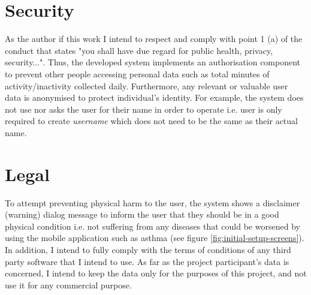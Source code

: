     \section{Security}
    As the author if this work I intend to respect and comply with point 1 (a) of the conduct that states "you shall have due regard for public health, privacy, security...". Thus, the developed system implements an authorisation component to prevent other people accessing personal data such as total minutes of activity/inactivity collected daily. Furthermore, any relevant or valuable user data is anonymised to protect individual’s identity. For example, the system does not use nor asks the user for their name in order to operate i.e. user is only required to create \textit{username} which does not need to be the same as their actual name.

    
    \section{Legal}
    To attempt preventing physical harm to the user, the system shows a disclaimer (warning) dialog message to inform the user that they should be in a good physical condition i.e. not suffering from any diseases that could be worsened by using the mobile application such as asthma (see figure \ref{fig:initial-setup-screens}). In addition, I intend to fully comply with the terms of conditions of any third party software that I intend to use. As far as the project participant’s data is concerned, I intend to keep the data only for the purposes of this project, and not use it for any commercial purpose.